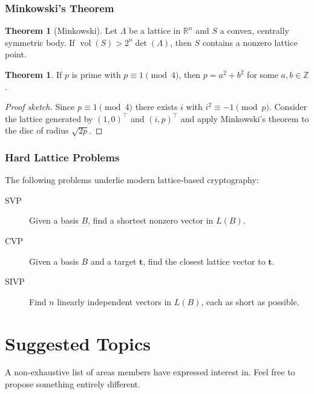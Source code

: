 \documentclass[12pt]{article}
\theoremstyle{definition}
\newtheorem{thm}[defn]{Theorem}
\theoremstyle{remark}
\newcommand{\Z}{\mathbb{Z}}
\newcommand{\R}{\mathbb{R}}
\newcommand{\vol}{\operatorname{vol}}
\begin{document}
\subsubsection{Minkowski's Theorem}

\begin{thm}[Minkowski]
Let $\Lambda$ be a lattice in $\R^n$ and $S$ a convex, centrally
symmetric body. If $\vol(S) > 2^n\det(\Lambda)$, then $S$ contains
a nonzero lattice point.
\end{thm}

\begin{thm}
If $p$ is prime with $p \equiv 1 \pmod{4}$, then
$p = a^2 + b^2$ for some $a,b\in\Z$.
\end{thm}

\begin{proof}[Proof sketch]
Since $p\equiv 1\pmod{4}$ there exists $i$ with $i^2\equiv-1\pmod p$.
Consider the lattice generated by $(1,0)^\top$ and $(i,p)^\top$
and apply Minkowski's theorem to the disc of radius $\sqrt{2p}$.
\end{proof}

\subsubsection{Hard Lattice Problems}

The following problems underlie modern lattice-based cryptography:

\begin{description}
  \item[SVP] Given a basis $B$, find a shortest nonzero vector in
    $L(B)$.
  \item[CVP] Given a basis $B$ and a target $\mathbf{t}$, find the
    closest lattice vector to $\mathbf{t}$.
  \item[SIVP] Find $n$ linearly independent vectors in $L(B)$, each
    as short as possible.
\end{description}

\section{Suggested Topics}

A non-exhaustive list of areas members have expressed interest in.
Feel free to propose something entirely different.
\end{document}
